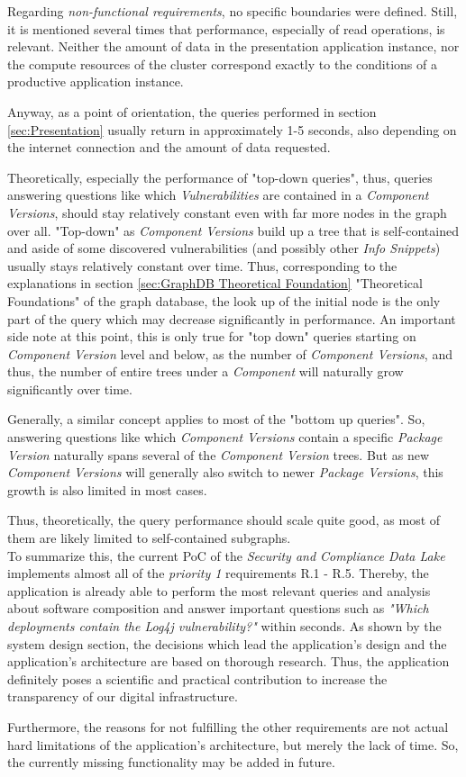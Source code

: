Regarding \emph{non-functional requirements}, no specific boundaries were defined. Still, it is mentioned several times that performance, especially of read operations, is relevant. Neither the amount of data in the presentation application instance, nor the compute resources of the cluster correspond exactly to the conditions of a productive application instance.\par
Anyway, as a point of orientation, the queries performed in section \ref{sec:Presentation} usually return in approximately 1-5 seconds, also depending on the internet connection and the amount of data requested.\par 
Theoretically, especially the performance of "top-down queries", thus, queries answering questions like which \emph{Vulnerabilities} are contained in a \emph{Component Versions}, should stay relatively constant even with far more nodes in the graph over all. "Top-down" as \emph{Component Versions} build up a tree that is self-contained and aside of some discovered vulnerabilities (and possibly other \emph{Info Snippets}) usually stays relatively constant over time. Thus, corresponding to the explanations in section \ref{sec:GraphDB Theoretical Foundation} "Theoretical Foundations" of the graph database, the look up of the initial node is the only part of the query which may decrease significantly in performance. An important side note at this point, this is only true for "top down" queries starting on \emph{Component Version} level and below, as the number of \emph{Component Versions}, and thus, the number of entire trees under a \emph{Component} will naturally grow significantly over time.\par
Generally, a similar concept applies to most of the "bottom up queries". So, answering questions like which \emph{Component Versions} contain a specific \emph{Package Version} naturally spans several of the \emph{Component Version} trees. But as new \emph{Component Versions} will generally also switch to newer \emph{Package Versions}, this growth is also limited in most cases.\par
Thus, theoretically, the query performance should scale quite good, as most of them are likely limited to self-contained subgraphs.\\

To summarize this, the current PoC of the \emph{Security and Compliance Data Lake} implements almost all of the \emph{priority 1} requirements R.1 - R.5. Thereby, the application is already able to perform the most relevant queries and analysis about software composition and answer important questions such as \emph{"Which deployments contain the Log4j vulnerability?"} within seconds. As shown by the system design section, the decisions which lead the application's design and the application's architecture are based on thorough research. Thus, the application definitely poses a scientific and practical contribution to increase the transparency of our digital infrastructure.\par
Furthermore, the reasons for not fulfilling the other requirements are not actual hard limitations of the application's architecture, but merely the lack of time. So, the currently missing functionality may be added in future.

